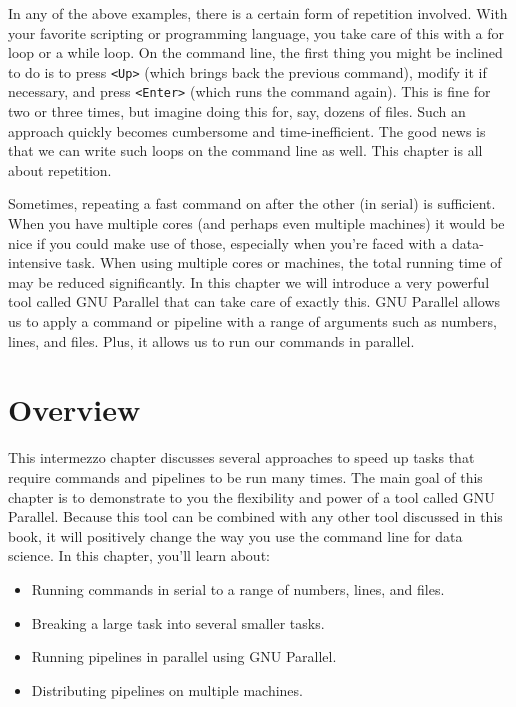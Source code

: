 \documentclass[
]{book}
\providecommand{\tightlist}{%
  \setlength{\itemsep}{0pt}\setlength{\parskip}{0pt}}
\theoremstyle{definition}
\theoremstyle{definition}
\theoremstyle{definition}
\theoremstyle{remark}
\begin{document}
In any of the above examples, there is a certain form of repetition involved. With your favorite scripting or programming language, you take care of this with a for loop or a while loop. On the command line, the first thing you might be inclined to do is to press \texttt{\textless{}Up\textgreater{}} (which brings back the previous command), modify it if necessary, and press \texttt{\textless{}Enter\textgreater{}} (which runs the command again). This is fine for two or three times, but imagine doing this for, say, dozens of files. Such an approach quickly becomes cumbersome and time-inefficient. The good news is that we can write such loops on the command line as well. This chapter is all about repetition.

Sometimes, repeating a fast command on after the other (in serial) is sufficient. When you have multiple cores (and perhaps even multiple machines) it would be nice if you could make use of those, especially when you're faced with a data-intensive task. When using multiple cores or machines, the total running time of may be reduced significantly. In this chapter we will introduce a very powerful tool called GNU Parallel that can take care of exactly this. GNU Parallel allows us to apply a command or pipeline with a range of arguments such as numbers, lines, and files. Plus, it allows us to run our commands in parallel.

\hypertarget{overview}{%
\section{Overview}\label{overview}}

This intermezzo chapter discusses several approaches to speed up tasks that require commands and pipelines to be run many times. The main goal of this chapter is to demonstrate to you the flexibility and power of a tool called GNU Parallel. Because this tool can be combined with any other tool discussed in this book, it will positively change the way you use the command line for data science. In this chapter, you'll learn about:

\begin{itemize}
\tightlist
\item
  Running commands in serial to a range of numbers, lines, and files.
\item
  Breaking a large task into several smaller tasks.
\item
  Running pipelines in parallel using GNU Parallel.
\item
  Distributing pipelines on multiple machines.
\end{itemize}
\end{document}
